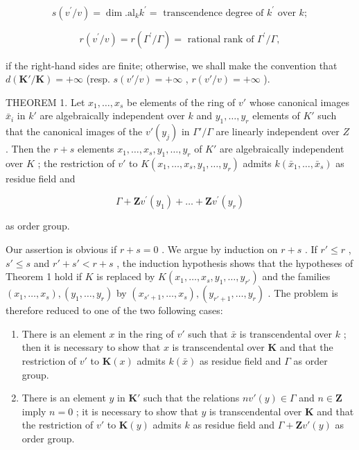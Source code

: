 \[
s (v ^ {\prime} / v) = \dim . \mathrm{al} _ {k} k ^ {\prime} = \text { transcendence   degree   of } k ^ {\prime} \text { over } k;
\]

\[
r (v ^ {\prime} / v) = r (\Gamma^ {\prime} / \Gamma) = \text { rational   rank   of } \Gamma^ {\prime} / \Gamma ,
\]

if the right-hand sides are finite; otherwise, we shall make the convention that \(d(\mathbf{K}' / \mathbf{K}) = +\infty\) (resp. \(s(v' / v) = +\infty\) , \(r(v' / v) = +\infty\) ).

THEOREM 1. Let \(x_1, \ldots, x_s\) be elements of the ring of \(v'\) whose canonical images \(\bar{x}_i\) in \(k'\) are algebraically independent over \(k\) and \(y_1, \ldots, y_r\) elements of \(K'\) such that the canonical images of the \(v'(y_j)\) in \(\Gamma'/\Gamma\) are linearly independent over \(Z\) . Then the \(r + s\) elements \(x_1, \ldots, x_s, y_1, \ldots, y_r\) of \(K'\) are algebraically independent over \(K\) ; the restriction of \(v'\) to \(K(x_1, \ldots, x_s, y_1, \ldots, y_r)\) admits \(k(\bar{x}_1, \ldots, \bar{x}_s)\) as residue field and

\[
\Gamma + \mathbf {Z} v ^ {\prime} (y _ {1}) + \dots + \mathbf {Z} v ^ {\prime} (y _ {r})
\]

as order group.

Our assertion is obvious if \(r + s = 0\) . We argue by induction on \(r + s\) . If \(r' \leqslant r\) , \(s' \leqslant s\) and \(r' + s' < r + s\) , the induction hypothesis shows that the hypotheses of Theorem 1 hold if \(K\) is replaced by \(K(x_1, \ldots, x_s, y_1, \ldots, y_{r'})\) and the families \((x_1, \ldots, x_s), (y_1, \ldots, y_r)\) by \((x_{s'+1}, \ldots, x_s), (y_{r'+1}, \ldots, y_r)\) . The problem is therefore reduced to one of the two following cases:

\begin{enumerate}
\def\labelenumi{(\alph{enumi})}
\item
  There is an element \(x\) in the ring of \(v'\) such that \(\bar{x}\) is transcendental over \(k\) ; then it is necessary to show that \(x\) is transcendental over \(\mathbf{K}\) and that the restriction of \(v'\) to \(\mathbf{K}(x)\) admits \(k(\bar{x})\) as residue field and \(\Gamma\) as order group.
\item
  There is an element \(y\) in \(\mathbf{K}'\) such that the relations \(nv'(y) \in \Gamma\) and \(n \in \mathbf{Z}\) imply \(n = 0\) ; it is necessary to show that \(y\) is transcendental over \(\mathbf{K}\) and that the restriction of \(v'\) to \(\mathbf{K}(y)\) admits \(k\) as residue field and \(\Gamma + \mathbf{Z}v'(y)\) as order group.
\end{enumerate}

